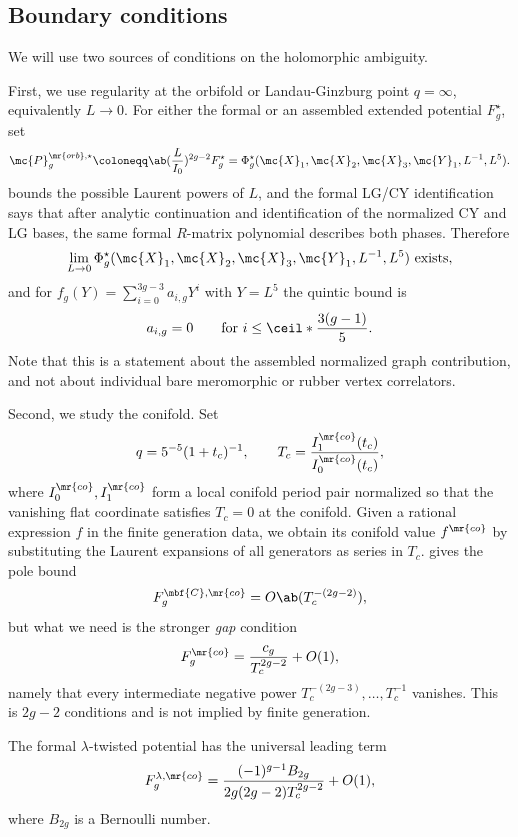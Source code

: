 \subsection{Boundary conditions}%
\label{sub:Boundary conditions}

We will use two sources of conditions on the holomorphic ambiguity.

First, we use regularity at the orbifold or Landau-Ginzburg point \(q = \infty\), equivalently \(L \to 0\). For either the formal or an assembled extended potential \(F_g^{\star}\), set
\[ \mc{P}_g^{\mr{orb},\star} \coloneqq \ab(\frac{L}{I_0})^{2g-2}F_g^{\star} = \Phi_g^{\star}(\mc{X}_1,\mc{X}_2,\mc{X}_3,\mc{Y}_1,L^{-1},L^5). \]
 bounds the possible Laurent powers of \(L\), and the formal LG/CY identification says that after analytic continuation and identification of the normalized CY and LG bases, the same formal \(R\)-matrix polynomial describes both phases. Therefore
\[ \lim_{L\to0}\Phi_g^{\star}(\mc{X}_1,\mc{X}_2,\mc{X}_3,\mc{Y}_1,L^{-1},L^5) \text{ exists}, \]
and for \(f_g(Y) = \sum_{i=0}^{3g-3}a_{i,g}Y^i\) with \(Y = L^5\) the quintic bound is
\[ a_{i,g} = 0 \qquad \text{for } i \leq \ceil*{\frac{3(g-1)}{5}}. \]
Note that this is a statement about the assembled normalized graph contribution, and not about individual bare meromorphic or rubber vertex correlators.

Second, we study the conifold. Set
\[ q = 5^{-5}(1+t_c)^{-1}, \qquad T_c = \frac{I_1^{\mr{co}}(t_c)}{I_0^{\mr{co}}(t_c)}, \]
where \(I_0^{\mr{co}}, I_1^{\mr{co}}\) form a local conifold period pair normalized so that the vanishing flat coordinate satisfies \(T_c = 0\) at the conifold. Given a rational expression \(f\) in the finite generation data, we obtain its conifold value \(f^{\mr{co}}\) by substituting the Laurent expansions of all generators as series in \(T_c\).  gives the pole bound
\[ F_g^{\mbf{C},\mr{co}} = O\ab(T_c^{-(2g-2)}), \]
but what we need is the stronger \textit{gap} condition
\[ F_g^{\mr{co}} = \frac{c_g}{T_c^{2g-2}} + O(1), \]
namely that every intermediate negative power \(T_c^{-(2g-3)}, \ldots, T_c^{-1}\) vanishes. This is \(2g-2\) conditions and is not implied by finite generation.

\begin{conj}%
\label{conj:formal conifold gap}
    The formal \(\lambda\)-twisted potential has the universal leading term
    \[ F_g^{\lambda,\mr{co}} = \frac{(-1)^{g-1}B_{2g}}{2g(2g-2)T_c^{2g-2}} + O(1), \]
    where \(B_{2g}\) is a Bernoulli number.
\end{conj}

